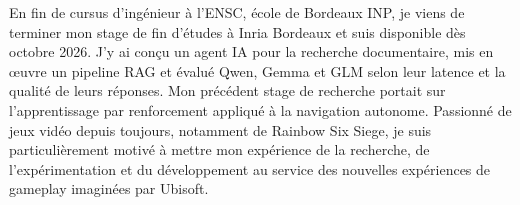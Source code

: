 
\begin{cvparagraph}
En fin de cursus d’ingénieur à l’ENSC, école de Bordeaux INP, je viens de terminer mon stage de fin d’études à Inria Bordeaux et suis disponible dès octobre 2026. J’y ai conçu un agent IA pour la recherche documentaire, mis en œuvre un pipeline RAG et évalué Qwen, Gemma et GLM selon leur latence et la qualité de leurs réponses. Mon précédent stage de recherche portait sur l’apprentissage par renforcement appliqué à la navigation autonome. Passionné de jeux vidéo depuis toujours, notamment de Rainbow Six Siege, je suis particulièrement motivé à mettre mon expérience de la recherche, de l’expérimentation et du développement au service des nouvelles expériences de gameplay imaginées par Ubisoft.
\end{cvparagraph}
